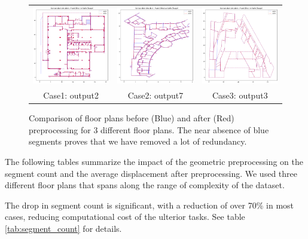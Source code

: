 \documentclass[11pt]{article}
\begin{document}
\begin{figure}[h]
    \centering
    \begin{tabular}{ccc}
        \includegraphics[width=0.32\linewidth]{figures/avant_apres_pretraitement2.png}
        &
        \includegraphics[width=0.32\linewidth]{figures/avant_apres_pretraitement7.png}
        &
        \includegraphics[width=0.32\linewidth]{figures/avant_apres_pretraitement3.png}
        \\
        Case1: output2 & Case2: output7 & Case3: output3 
    \end{tabular}

    \caption{Comparison of floor plans before (Blue) and after (Red) preprocessing 
    for 3 different floor plans. The near absence of blue segments proves that
    we have removed a lot of redundancy.}
    \label{fig:geojson_comparison}
\end{figure}
The following tables summarize the impact of the geometric preprocessing on the
segment count and the average displacement after preprocessing. We used three 
different floor plans that spans along the range of complexity of the dataset.

The drop in segment count is significant, with a reduction of over 70\% in most cases, 
reducing computational cost of the ulterior tasks. See table \ref{tab:segment_count} for details.
\end{document}
